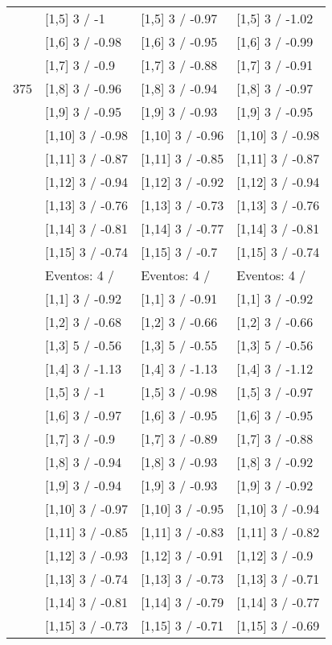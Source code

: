 \begin{table}
\begin{tabular}[t]{llll}
 & {}[1,5] 3  / -1 & {}[1,5] 3  / -0.97 & {}[1,5] 3  / -1.02\\
 & {}[1,6] 3  / -0.98 & {}[1,6] 3  / -0.95 & {}[1,6] 3  / -0.99\\
 & {}[1,7] 3  / -0.9 & {}[1,7] 3  / -0.88 & {}[1,7] 3  / -0.91\\
375 & {}[1,8] 3  / -0.96 & {}[1,8] 3  / -0.94 & {}[1,8] 3  / -0.97\\
\addlinespace
 & {}[1,9] 3  / -0.95 & {}[1,9] 3  / -0.93 & {}[1,9] 3  / -0.95\\
 & {}[1,10] 3  / -0.98 & {}[1,10] 3  / -0.96 & {}[1,10] 3  / -0.98\\
 & {}[1,11] 3  / -0.87 & {}[1,11] 3  / -0.85 & {}[1,11] 3  / -0.87\\
 & {}[1,12] 3  / -0.94 & {}[1,12] 3  / -0.92 & {}[1,12] 3  / -0.94\\
 & {}[1,13] 3  / -0.76 & {}[1,13] 3  / -0.73 & {}[1,13] 3  / -0.76\\
\addlinespace
 & {}[1,14] 3  / -0.81 & {}[1,14] 3  / -0.77 & {}[1,14] 3  / -0.81\\
 & {}[1,15] 3  / -0.74 & {}[1,15] 3  / -0.7 & {}[1,15] 3  / -0.74\\
 & Eventos:  4 / & Eventos:  4 / & Eventos:  4 /\\
 & {}[1,1] 3  / -0.92 & {}[1,1] 3  / -0.91 & {}[1,1] 3  / -0.92\\
 & {}[1,2] 3  / -0.68 & {}[1,2] 3  / -0.66 & {}[1,2] 3  / -0.66\\
\addlinespace
 & {}[1,3] 5  / -0.56 & {}[1,3] 5  / -0.55 & {}[1,3] 5  / -0.56\\
 & {}[1,4] 3  / -1.13 & {}[1,4] 3  / -1.13 & {}[1,4] 3  / -1.12\\
 & {}[1,5] 3  / -1 & {}[1,5] 3  / -0.98 & {}[1,5] 3  / -0.97\\
 & {}[1,6] 3  / -0.97 & {}[1,6] 3  / -0.95 & {}[1,6] 3  / -0.95\\
 & {}[1,7] 3  / -0.9 & {}[1,7] 3  / -0.89 & {}[1,7] 3  / -0.88\\
\addlinespace
500 & {}[1,8] 3  / -0.94 & {}[1,8] 3  / -0.93 & {}[1,8] 3  / -0.92\\
 & {}[1,9] 3  / -0.94 & {}[1,9] 3  / -0.93 & {}[1,9] 3  / -0.92\\
 & {}[1,10] 3  / -0.97 & {}[1,10] 3  / -0.95 & {}[1,10] 3  / -0.94\\
 & {}[1,11] 3  / -0.85 & {}[1,11] 3  / -0.83 & {}[1,11] 3  / -0.82\\
 & {}[1,12] 3  / -0.93 & {}[1,12] 3  / -0.91 & {}[1,12] 3  / -0.9\\
\addlinespace
 & {}[1,13] 3  / -0.74 & {}[1,13] 3  / -0.73 & {}[1,13] 3  / -0.71\\
 & {}[1,14] 3  / -0.81 & {}[1,14] 3  / -0.79 & {}[1,14] 3  / -0.77\\
 & {}[1,15] 3  / -0.73 & {}[1,15] 3  / -0.71 & {}[1,15] 3  / -0.69\\
\bottomrule
\end{tabular}
\end{table}

